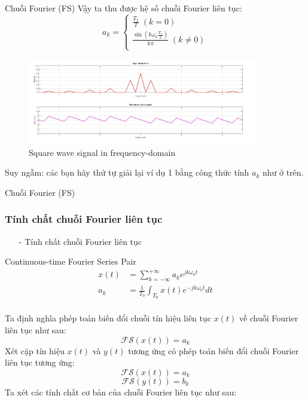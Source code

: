 \documentclass[8pt]{beamer}
\begin{document}
\begin{frame}{Chuỗi Fourier (FS)}
Vậy ta thu được hệ số chuỗi Fourier liên tục:
\begin{equation*}
	a_{k}=
	\begin{cases}
		\frac{T_{1}}{T} \; (k=0)\\
		\frac{\sin{\left(k\omega_{0}\frac{T_{1}}{2}\right)}}{k\pi} \;(k\neq0)\\

	\end{cases}
\end{equation*}
\begin{figure}[h]
			\includegraphics[width=0.9\textwidth]{s.jpg}
			\caption{Square wave signal in frequency-domain}\label{fig:re11}

		\end{figure}
	Suy ngẫm: các bạn hãy thử tự giải lại ví dụ 1 bằng công thức tính $a_{k}$ như ở trên.
\end{frame}
\begin{frame}{Chuỗi Fourier (FS)}
\subsubsection{Tính chất chuỗi Fourier liên tục}
\begin{itemize}
	\item[-] Tính chất chuỗi Fourier liên tục
\end{itemize}
\begin{block}{Continuous-time Fourier  Series Pair}
\begin{equation*}
\begin{split}
	x(t)&=\sum_{k=-\infty}^{+\infty}a_{k}e^{jk\omega_{0}t}\\
	a_{k}&=\frac{1}{T_{0}}\int_{T_{0}}x(t)e^{-jk\omega_{0}t}dt\\
\end{split}
\end{equation*}
\end{block}
Ta định nghĩa phép toán biến đổi chuỗi tín hiệu liên tục $x(t)$ về chuỗi Fourier liên tục như sau:
$$\mathscr{FS}(x(t))=a_{k}$$
Xét cặp tín hiệu $x(t)$ và $y(t)$ tương ứng có phép toán biến đổi chuỗi Fourier liên tục tương ứng:
$$\mathscr{FS}(x(t))=a_{k}$$
$$\mathscr{FS}(y(t))=b_{k}$$
Ta xét các tính chất cơ bản của chuỗi Fourier liên tục như sau:
\end{frame}
\end{document}
